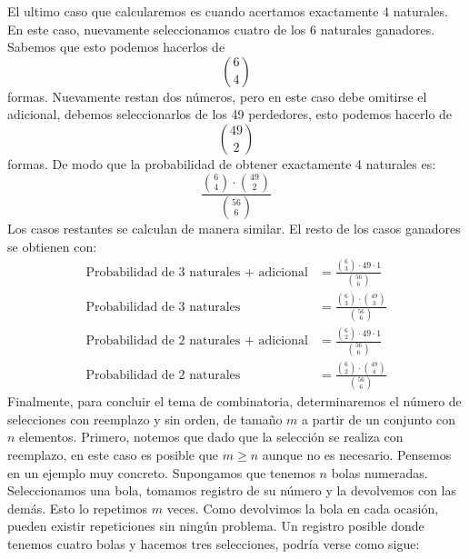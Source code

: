 \documentclass[14pt]{extreport}
\theoremstyle{definicion}
\theoremstyle{propiedad}
\begin{document}
El ultimo caso que calcularemos es cuando acertamos exactamente 4 naturales. En este caso, nuevamente seleccionamos cuatro de los 6 naturales ganadores. Sabemos que esto podemos hacerlos de 
$$
\binom{6}{4}
$$ 
formas. Nuevamente restan dos números, pero en este caso debe omitirse el adicional, debemos seleccionarlos de los 49 perdedores, esto podemos hacerlo de
$$
\binom{49}{2}
$$
formas. De modo que la probabilidad de obtener exactamente 4 naturales es:
$$
\frac{\binom{6}{4}\cdot \binom{49}{2}}{\binom{56}{6}}
$$
Los casos restantes se calculan de manera similar. El resto de los casos ganadores se obtienen con:
\begin{align*}
  \text{Probabilidad de 3 naturales + adicional} & = \frac{\binom{6}{3}\cdot 49 \cdot 1}{\binom{56}{6}}\\
  \text{Probabilidad de 3 naturales} & = \frac{\binom{6}{3}\cdot \binom{49}{3}}{\binom{56}{6}}\\
  \text{Probabilidad de 2 naturales + adicional} & = \frac{\binom{6}{2}\cdot 49 \cdot 1}{\binom{56}{6}}\\
  \text{Probabilidad de 2 naturales} & = \frac{\binom{6}{2}\cdot \binom{49}{4}}{\binom{56}{6}}
\end{align*}
Finalmente, para concluir el tema de combinatoria, determinaremos el número de selecciones con reemplazo y sin orden, de tamaño $m$ a partir de un conjunto con $n$ elementos. Primero, notemos que dado que la selección se realiza con reemplazo, en este caso es posible que $m \geq n$ aunque no es necesario. Pensemos en un ejemplo muy concreto. Supongamos que tenemos $n$ bolas numeradas. Seleccionamos una bola, tomamos registro de su número y la devolvemos con las demás. Esto lo repetimos $m$ veces. Como devolvimos la bola en cada ocasión, pueden existir repeticiones sin ningún problema. Un registro posible donde  tenemos cuatro bolas y hacemos tres selecciones, podría verse como sigue:
\end{document}
